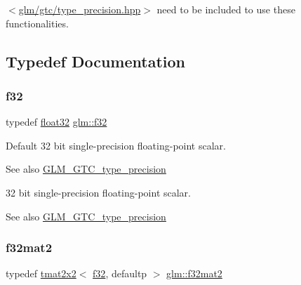 $<$\hyperlink{type__precision_8hpp}{glm/gtc/type\+\_\+precision.\+hpp}$>$ need to be included to use these functionalities. 

\subsection{Typedef Documentation}
\mbox{\label{group__gtc__type__precision_ga0ec999b57f5330d9021256e96038df04}} 
\subsubsection{\texorpdfstring{f32}{f32}}
{\footnotesize\ttfamily typedef \hyperlink{group__gtc__type__precision_ga814f2f65354b6588b067cc5c67a6b340}{float32} \hyperlink{group__gtc__type__precision_ga0ec999b57f5330d9021256e96038df04}{glm\+::f32}}

Default 32 bit single-\/precision floating-\/point scalar. \begin{DoxySeeAlso}{See also}
\hyperlink{group__gtc__type__precision}{G\+L\+M\+\_\+\+G\+T\+C\+\_\+type\+\_\+precision}
\end{DoxySeeAlso}
32 bit single-\/precision floating-\/point scalar. \begin{DoxySeeAlso}{See also}
\hyperlink{group__gtc__type__precision}{G\+L\+M\+\_\+\+G\+T\+C\+\_\+type\+\_\+precision} 
\end{DoxySeeAlso}
\mbox{\label{group__gtc__type__precision_ga29b40a1141234160a627a540eceedd31}} 
\subsubsection{\texorpdfstring{f32mat2}{f32mat2}}
{\footnotesize\ttfamily typedef \hyperlink{structglm_1_1tmat2x2}{tmat2x2}$<$ \hyperlink{group__gtc__type__precision_ga0ec999b57f5330d9021256e96038df04}{f32}, defaultp $>$ \hyperlink{group__gtc__type__precision_ga29b40a1141234160a627a540eceedd31}{glm\+::f32mat2}}

